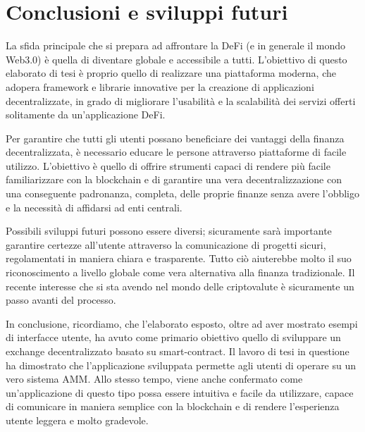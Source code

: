 \chapter{Conclusioni e sviluppi futuri}\makeatletter{}\makeatother
\label{cap4}

La sfida principale che si prepara ad affrontare la DeFi (e in generale il mondo Web3.0) è quella di diventare globale e accessibile a tutti. L'obiettivo di questo elaborato di tesi è proprio quello di realizzare una piattaforma moderna, che adopera framework e librarie innovative per la creazione di applicazioni decentralizzate, in grado di migliorare l’usabilità e la scalabilità dei servizi offerti solitamente da un'applicazione DeFi.

Per garantire che tutti gli utenti possano beneficiare dei vantaggi della finanza decentralizzata, è necessario educare le persone attraverso piattaforme di facile utilizzo. L'obiettivo è quello di offrire strumenti capaci di rendere più facile familiarizzare con la blockchain e di garantire una vera decentralizzazione con una conseguente padronanza, completa, delle proprie finanze senza avere l'obbligo e la necessità di affidarsi ad enti centrali.

Possibili sviluppi futuri possono essere diversi; sicuramente sarà importante garantire certezze all'utente attraverso la comunicazione di progetti sicuri, regolamentati in maniera chiara e trasparente. Tutto ciò aiuterebbe molto il suo riconoscimento a livello globale come vera alternativa alla finanza tradizionale. Il recente interesse che si sta avendo nel mondo delle criptovalute è sicuramente un passo avanti del processo.

In conclusione, ricordiamo, che l'elaborato esposto, oltre ad aver mostrato esempi di interfacce utente, ha avuto come primario obiettivo quello di sviluppare un exchange decentralizzato basato su smart-contract. Il lavoro di tesi in questione ha dimostrato che l'applicazione sviluppata permette agli utenti di operare su un vero sistema AMM. Allo stesso tempo, viene anche confermato come un'applicazione di questo tipo possa essere intuitiva e facile da utilizzare, capace di comunicare in maniera semplice con la blockchain e di rendere l’esperienza utente leggera e molto gradevole.